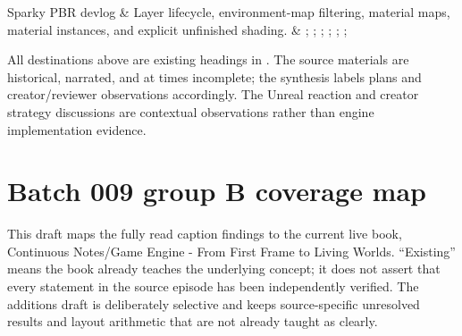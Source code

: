 {\begin{longtable}[]
 Sparky PBR devlog & Layer lifecycle, environment-map filtering, material maps, material instances, and explicit unfinished shading. & ; ; ; ; ; ;  \\
\end{longtable}
}

All destinations above are existing headings in . The source materials are historical, narrated, and at times incomplete; the synthesis labels plans and creator/reviewer observations accordingly. The Unreal reaction and creator strategy discussions are contextual observations rather than engine implementation evidence.

\section{Batch 009 group B coverage map}\label{appendix-877738f6f4d2-batch-009-group-b-coverage-map}

\hypertarget{appendix-877738f6f4d2-batch-009-group-b-coverage-map}{}

This draft maps the fully read caption findings to the current live book, {Continuous Notes/Game Engine - From First Frame to Living Worlds}. ``Existing'' means the book already teaches the underlying concept; it does not assert that every statement in the source episode has been independently verified. The additions draft is deliberately selective and keeps source-specific unresolved results and layout arithmetic that are not already taught as clearly.

